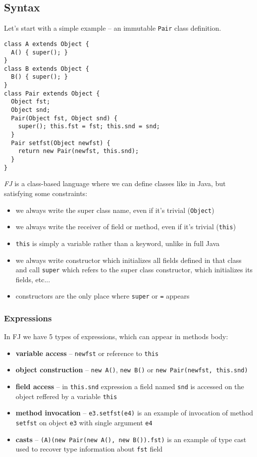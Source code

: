 \documentclass{article}[12pt]
\begin{document}
\subsection{Syntax}

Let's start with a simple example -- an immutable \texttt{Pair} class
definition.

\begin{verbatim}
class A extends Object {
  A() { super(); }
}
class B extends Object {
  B() { super(); }
}
class Pair extends Object {
  Object fst;
  Object snd;
  Pair(Object fst, Object snd) {
    super(); this.fst = fst; this.snd = snd;
  }
  Pair setfst(Object newfst) {
    return new Pair(newfst, this.snd);
  }
}
\end{verbatim}

\emph{FJ} is a class-based language where we can define classes like in
Java, but satisfying some constraints:

\begin{itemize}
\item we always write the super class name, even if it's trivial
  (\texttt{Object})
\item we always write the receiver of field or method, even if it's
  trivial (\texttt{this})
\item \texttt{this} is simply a variable rather than a keyword, unlike
  in full Java
\item we always write constructor which initializes all fields
  defined in that class and call \texttt{super} which refers to the
  super class constructor, which initializes its fields, etc...
\item constructors are the only place where \texttt{super} or
  \texttt{=} appears
\end{itemize}

\subsubsection{Expressions}

In FJ we have 5 types of expressions, which can appear in methods body:

\begin{itemize}
\item{\textbf{variable access}} -- \texttt{newfst} or reference to
  \texttt{this}
\item{\textbf{object construction}} -- \texttt{new A()},
  \texttt{new B()} or \texttt{new Pair(newfst, this.snd)}
\item{\textbf{field access}} -- in \texttt{this.snd} expression 
  a field named \texttt{snd} is accessed on the object reffered by
  a variable \texttt{this}
\item{\textbf{method invocation}} -- \texttt{e3.setfst(e4)}
  is an example of invocation of method \texttt{setfst} on object
  \texttt{e3} with single argument \texttt{e4}
\item{\textbf{casts}} -- \texttt{(A)(new Pair(new A(), new B()).fst)}
  is an example of type cast used to recover type information about
  \texttt{fst} field
\end{itemize}
\end{document}
